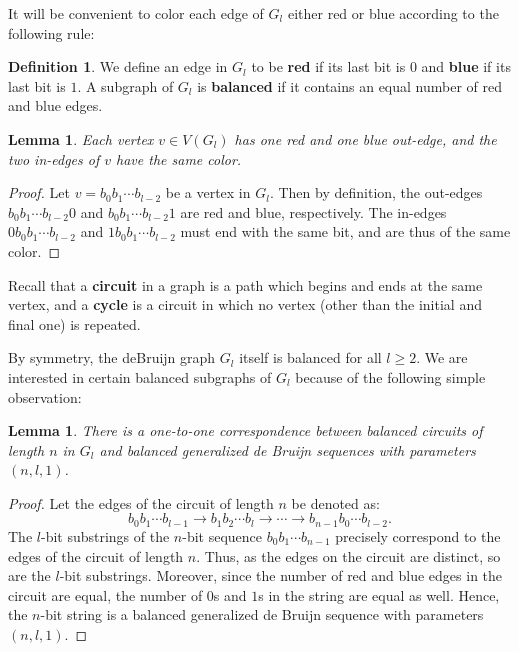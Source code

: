 \documentclass{article}
\theoremstyle{plain}
\newtheorem{lemma}[theorem]{Lemma}
\theoremstyle{definition}
\newtheorem{definition}[theorem]{Definition}
\theoremstyle{remark}
\begin{document}
It will be convenient to color each edge of $G_l$ either red or blue according to the following rule:

\medskip

\begin{definition}
We define an edge in $G_l$ to be \textbf{red} if its last bit is $0$ and \textbf{blue} if its last bit is $1$. A subgraph of $G_l$ is \textbf{balanced} if it contains an equal number of red and blue edges.
\end{definition}

\medskip

\begin{lemma}\label{redblue}
Each vertex $v \in V(G_l)$ has one red and one blue out-edge, and the two in-edges of $v$ have the same color.
\end{lemma}
\begin{proof}
Let $v=b_0b_1\cdots b_{l-2}$ be a vertex in $G_l$. Then by definition, the out-edges $b_0b_1\cdots b_{l-2}0$ and $b_0b_1\cdots b_{l-2}1$ are red and blue, respectively. The in-edges $0b_0b_1\cdots b_{l-2}$ and $1b_0b_1\cdots b_{l-2}$ must end with the same bit, and are thus of the same color.
\end{proof}

Recall that a \textbf{circuit} in a graph is a path which begins and ends at the same vertex, and a \textbf{cycle} is a circuit in which no vertex (other than the initial and final one) is repeated.

By symmetry, the deBruijn graph $G_l$ itself is balanced for all $l \geqslant 2$. We are interested in certain balanced subgraphs of $G_l$ because of the following simple observation: 

\medskip

\begin{lemma}\label{sev}
There is a one-to-one correspondence between balanced circuits of length $n$ in $G_l$ and balanced generalized de Bruijn sequences with parameters $(n,l,1)$.
\end{lemma}

\begin{proof}
Let the edges of the circuit of length $n$ be denoted as: 
\[b_0b_1\cdots b_{l-1} \to b_1b_2\cdots b_l \to \cdots \to b_{n-1}b_0\cdots b_{l-2} . \]
The $l$-bit substrings of the $n$-bit sequence $b_0b_1\cdots b_{n-1}$ precisely correspond to the edges of the circuit of length $n$. Thus, as the edges on the circuit are distinct, so are the $l$-bit substrings. Moreover, since the number of red and blue edges in the circuit are equal, the number of $0$s and $1$s in the string are equal as well. Hence, the $n$-bit string is a balanced generalized de Bruijn sequence with parameters $(n,l,1)$.
\end{proof}
\end{document}
